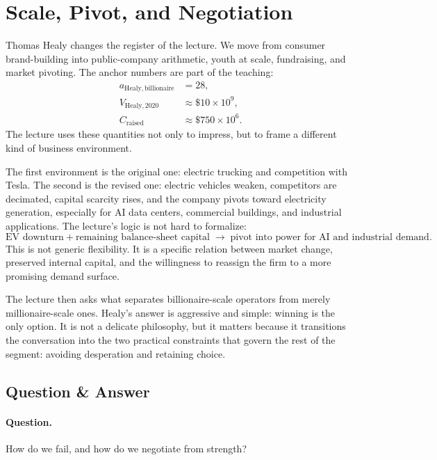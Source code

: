 \section{Scale, Pivot, and Negotiation}

Thomas Healy changes the register of the lecture. We move from consumer brand-building into public-company arithmetic, youth at scale, fundraising, and market pivoting. The anchor numbers are part of the teaching:
\begin{align}
a_{\mathrm{Healy,billionaire}} &= 28,\\
V_{\mathrm{Healy},2020} &\approx \$10\times 10^{9},\\
C_{\mathrm{raised}} &\approx \$750\times 10^{6}.
\end{align}
The lecture uses these quantities not only to impress, but to frame a different kind of business environment.

The first environment is the original one: electric trucking and competition with Tesla. The second is the revised one: electric vehicles weaken, competitors are decimated, capital scarcity rises, and the company pivots toward electricity generation, especially for AI data centers, commercial buildings, and industrial applications. The lecture's logic is not hard to formalize:
\begin{equation}
\text{EV downturn} + \text{remaining balance-sheet capital}
\;\longrightarrow\;
\text{pivot into power for AI and industrial demand}.
\end{equation}
This is not generic flexibility. It is a specific relation between market change, preserved internal capital, and the willingness to reassign the firm to a more promising demand surface.

The lecture then asks what separates billionaire-scale operators from merely millionaire-scale ones. Healy's answer is aggressive and simple: winning is the only option. It is not a delicate philosophy, but it matters because it transitions the conversation into the two practical constraints that govern the rest of the segment: avoiding desperation and retaining choice.

\subsection{Question \& Answer}

\paragraph{Question.} How do we fail, and how do we negotiate from strength?

